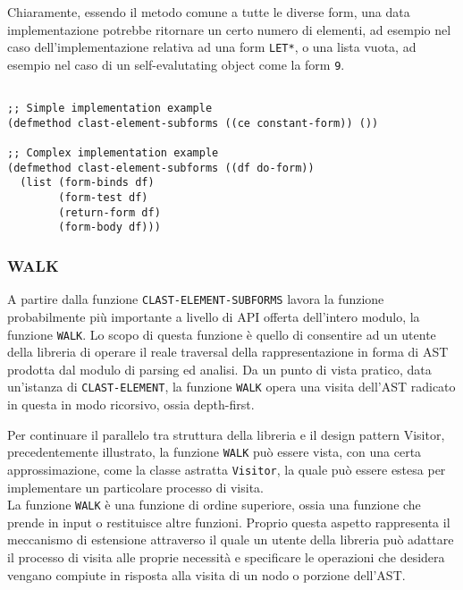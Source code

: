 Chiaramente, essendo il metodo comune a tutte le diverse form, una data
implementazione potrebbe ritornare un certo numero di elementi, ad esempio nel
caso dell'implementazione relativa ad una form \texttt{LET*}, o una lista vuota,
ad esempio nel caso di un self-evalutating object come la form \texttt{9}.

\begin{lstlisting}[caption=Esempi di implementazione del metodo \texttt
{CLAST-ELEMENT-SUBFORMS}]

;; Simple implementation example
(defmethod clast-element-subforms ((ce constant-form)) ())

;; Complex implementation example
(defmethod clast-element-subforms ((df do-form))
  (list (form-binds df)
        (form-test df)
        (return-form df)
        (form-body df)))

\end{lstlisting}

\subsubsection{WALK}

A partire dalla funzione \texttt{CLAST-ELEMENT-SUBFORMS} lavora la funzione
probabilmente più importante a livello di API offerta dell'intero modulo, la
funzione \texttt{WALK}. Lo scopo di questa funzione è quello di consentire ad un
utente della libreria di operare il reale traversal della rappresentazione in
forma di AST prodotta dal modulo di parsing ed analisi. Da un punto di vista
pratico, data un'istanza di \texttt{CLAST-ELEMENT}, la funzione \texttt{WALK}
opera una visita dell'AST radicato in questa in modo ricorsivo, ossia
depth-first.

Per continuare il parallelo tra struttura della libreria e il design pattern
Visitor, precedentemente illustrato, la funzione \texttt{WALK} può essere
vista, con una certa approssimazione, come la classe astratta
\texttt{Visitor}, la quale può essere estesa per implementare un particolare
processo di visita.\\


La funzione \texttt{WALK} è una funzione di ordine superiore, ossia una funzione
che prende in input o restituisce altre funzioni. Proprio questa aspetto
rappresenta il meccanismo di estensione attraverso il quale un utente della
libreria può adattare il processo di visita alle proprie necessità e specificare
le operazioni che desidera vengano compiute in risposta alla visita di un nodo o
porzione dell'AST.

